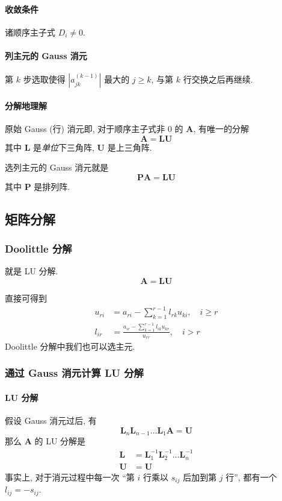 \documentclass{ctexart}
\begin{document}
\paragraph{收敛条件}
    诸顺序主子式 $D_i \neq 0$.\par
\paragraph{列主元的 Gauss 消元}
    第 $k$ 步选取使得 $|a^{(k-1)}_{jk}|$ 最大的 $j \ge k$, 与第 $k$ 行交换之后再继续.
\paragraph{分解地理解}
    原始 Gauss (行) 消元即, 对于顺序主子式非 0 的 $\mathbf{A}$, 有唯一的分解 \[
        \mathbf{A} = \mathbf{L} \mathbf{U}\]
    其中 $\mathbf{L}$ 是\emph{单位}下三角阵, $\mathbf{U}$ 是上三角阵.\par
    选列主元的 Gauss 消元就是 \[
        \mathbf{P} \mathbf{A} = \mathbf{L} \mathbf{U}\]
    其中 $\mathbf{P}$ 是排列阵.

\subsection{矩阵分解}
\subsubsection{Doolittle 分解}
    就是 LU 分解. \[
        \mathbf{A} = \mathbf{L} \mathbf{U}
    \]
    \par
    直接可得到 \begin{align*}
        u_{ri} &= a_{ri} - \sum_{k=1}^{r-1} l_{rk} u_{ki},\quad i \ge r\\
        l_{ir} &= \frac{a_{ir} - \sum_{k=1}^{r-1} l_{ik} u_{kr}}{u_{rr}},\quad i > r
    \end{align*}
    Doolittle 分解中我们也可以选主元.
\subsubsection{通过 Gauss 消元计算 LU 分解}
\paragraph{LU 分解}
    假设 Gauss 消元过后, 有\[
        \mathbf{L}_n \mathbf{L}_{n-1} \ldots \mathbf{L}_1 \mathbf{A} = \mathbf{U}\]
    那么 $\mathbf{A}$ 的 LU 分解是 \begin{align*}
        \mathbf{L} &= \mathbf{L}_1^{-1} \mathbf{L}_2^{-1} \ldots \mathbf{L}_n^{-1}\\
        \mathbf{U} &= \mathbf{U}
    \end{align*}
    事实上, 对于消元过程中每一次 ``第 $i$ 行乘以 $s_{ij}$ 后加到第 $j$ 行'',
    都有一个 $l_{ij} = -s_{ij}$.
\end{document}

